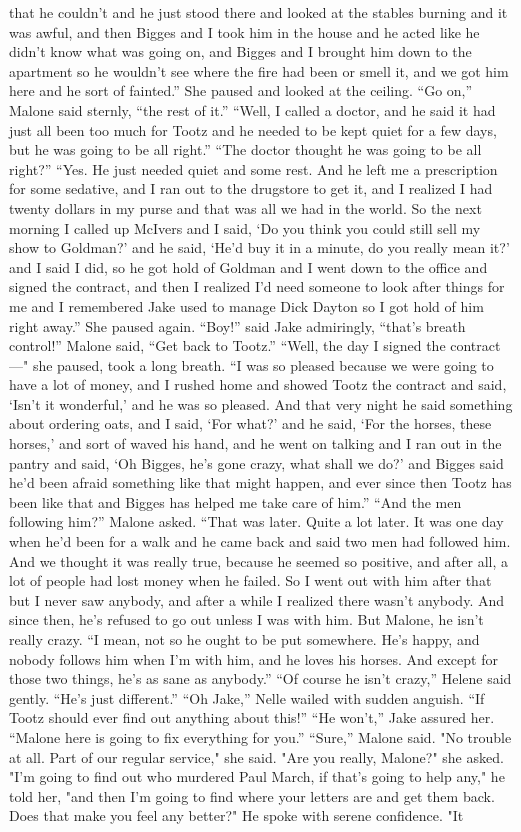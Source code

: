 \documentclass{novel}
\begin{document}
that he couldn’t and he just stood there and looked at the stables burning and it was awful, and then Bigges and I took him in the house and he acted like he didn’t know what was going on, and Bigges and I brought him down to the apartment so he wouldn’t see where the fire had been or smell it, and we got him here and he sort of fainted.” She paused and looked at the ceiling. “Go on,” Malone said sternly, “the rest of it.” “Well, I called a doctor, and he said it had just all been too much for Tootz and he needed to be kept quiet for a few days, but he was going to be all right.” “The doctor thought he was going to be all right?” “Yes. He just needed quiet and some rest. And he left me a prescription for some sedative, and I ran out to the drugstore to get it, and I realized I had twenty dollars in my purse and that was all we had in the world. So the next morning I called up McIvers and I said, ‘Do you think you could still sell my show to Goldman?’ and he said, ‘He’d buy it in a minute, do you really mean it?’ and I said I did, so he got hold of Goldman and I went down to the office and signed the contract, and then I realized I’d need someone to look after things for me and I remembered Jake used to manage Dick Dayton so I got hold of him right away.” She paused again. “Boy!” said Jake admiringly, “that’s breath control!” Malone said, “Get back to Tootz.” “Well, the day I signed the contract—" she paused, took a long breath. “I was so pleased because we were going to have a lot of money, and I rushed home and showed Tootz the contract and said, ‘Isn’t it wonderful,’ and he was so pleased. And that very night he said something about ordering oats, and I said, ‘For what?’ and he said, ‘For the horses, these horses,’ and sort of waved his hand, and he went on talking and I ran out in the pantry and said, ‘Oh Bigges, he’s gone crazy, what shall we do?’ and Bigges said he’d been afraid something like that might happen, and ever since then Tootz has been like that and Bigges has helped me take care of him.” “And the men following him?” Malone asked. “That was later. Quite a lot later. It was one day when he’d been for a walk and he came back and said two men had followed him. And we thought it was really true, because he seemed so positive, and after all, a lot of people had lost money when he failed. So I went out with him after that but I never saw anybody, and after a while I realized there wasn’t anybody. And since then, he’s refused to go out unless I was with him. But Malone, he isn’t really crazy. “I mean, not so he ought to be put somewhere. He’s happy, and nobody follows him when I’m with him, and he loves his horses. And except for those two things, he’s as sane as anybody.” “Of course he isn’t crazy,” Helene said gently. “He’s just different.” “Oh Jake,” Nelle wailed with sudden anguish. “If Tootz should ever find out anything about this!” “He won’t,” Jake assured her. “Malone here is going to fix everything for you.” “Sure,” Malone said. "No trouble at all. Part of our regular service," she said. "Are you really, Malone?" she asked. "I’m going to find out who murdered Paul March, if that’s going to help any," he told her, "and then I’m going to find where your letters are and get them back. Does that make you feel any better?" He spoke with serene confidence. "It 
\end{document}
